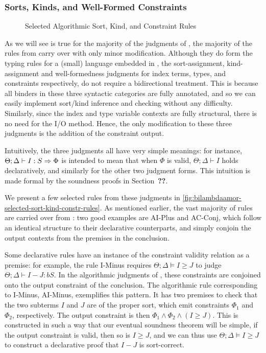 \subsubsection{Sorts, Kinds, and Well-Formed Constraints}
\begin{figure}

\caption{Selected Algorithmic Sort, Kind, and Constraint Rules}
\label{fig:bilambdaamor-selected-sort-kind-constr-rules}
\end{figure}

As we will see is true for the majority of the judgments of \bilambdaamor, the majority of the rules from \dlambdaamor carry over with only minor modification. Although they do form the typing rules for a (small) language embedded in \bilambdaamor, the sort-assignment, kind-assignment and well-formedness judgments for index terms, types, and constraints respectively, do not require a bidirectional treatment. This is because all binders in these three syntactic categories are fully annotated, and so we can easily implement sort/kind inference and checking without any difficulty. Similarly, since the index and type variable contexts are fully structural, there is no need for the I/O method. Hence, the only modification to these three judgments is the addition of the constraint output.

Intuitively, the three judgments all have very simple meanings: for instance, $\Theta ; \Delta \vdash I : S \Rightarrow \Phi$ is intended to mean that when $\Phi$ is valid, $\Theta ; \Delta \vdash I$ holds declaratively, and similarly for the other two judgment forms. This intuition is made formal by the soundness proofs in Section~\textbf{??}.

We present a few selected rules from these judgments in \autoref{fig:bilambdaamor-selected-sort-kind-constr-rules}. As mentioned earlier, the vast majority of rules are carried over from \dlambdaamor: two good examples are AI-Plus and AC-Conj, which follow an identical structure to their declarative counterparts, and simply conjoin the output contexts from the premises in the conclusion.

Some declarative rules have an instance of the constraint validity relation as a premise: for example, the rule I-Minus requires $\Theta ; \Delta \vDash I \geq J$ to judge $\Theta ; \Delta \vdash I - J : bS$. In the algorithmic judgments of \bilambdaamor, these constraints are conjoined onto the output constraint of the conclusion. The algorithmic rule corresponding to I-Minus, AI-Minus, exemplifies this pattern. It has two premises to check that the two subterms $I$ and $J$ are of the proper sort, which emit constraints $\Phi_1$ and $\Phi_2$, respectively. The output constraint is then $\Phi_1 \wedge \Phi_2 \wedge (I \geq J)$. This is constructed in such a way that our eventual soundness theorem will be simple, if the output constraint is valid, then so is $I \geq J$, and we can thus use $\Theta ; \Delta \vDash I \geq J$ to construct a declarative proof that $I - J$ is sort-correct.

